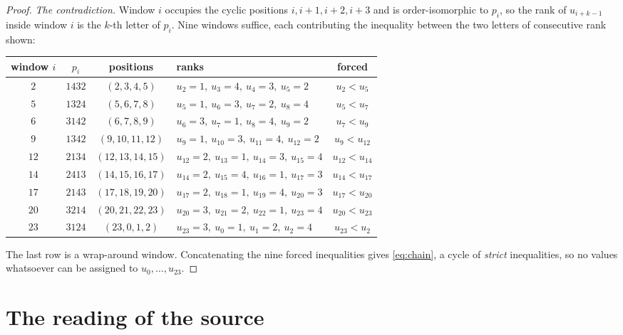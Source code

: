 \documentclass[11pt]{amsart}
\begin{document}
\begin{proof}
\emph{The contradiction.} Window $i$ occupies the cyclic positions
$i,i+1,i+2,i+3$ and is order-isomorphic to $p_i$, so the rank of $u_{i+k-1}$
inside window $i$ is the $k$-th letter of $p_i$. Nine windows suffice, each
contributing the inequality between the two letters of consecutive rank shown:
\begin{center}\small
\begin{tabular}{c|c|c|l|c}
window $i$ & $p_i$ & positions & ranks & forced\\\hline
$2$ & $1432$ & $(2,3,4,5)$ & $u_2{=}1,\ u_3{=}4,\ u_4{=}3,\ u_5{=}2$ & $u_2<u_5$\\
$5$ & $1324$ & $(5,6,7,8)$ & $u_5{=}1,\ u_6{=}3,\ u_7{=}2,\ u_8{=}4$ & $u_5<u_7$\\
$6$ & $3142$ & $(6,7,8,9)$ & $u_6{=}3,\ u_7{=}1,\ u_8{=}4,\ u_9{=}2$ & $u_7<u_9$\\
$9$ & $1342$ & $(9,10,11,12)$ & $u_9{=}1,\ u_{10}{=}3,\ u_{11}{=}4,\ u_{12}{=}2$ & $u_9<u_{12}$\\
$12$ & $2134$ & $(12,13,14,15)$ & $u_{12}{=}2,\ u_{13}{=}1,\ u_{14}{=}3,\ u_{15}{=}4$ & $u_{12}<u_{14}$\\
$14$ & $2413$ & $(14,15,16,17)$ & $u_{14}{=}2,\ u_{15}{=}4,\ u_{16}{=}1,\ u_{17}{=}3$ & $u_{14}<u_{17}$\\
$17$ & $2143$ & $(17,18,19,20)$ & $u_{17}{=}2,\ u_{18}{=}1,\ u_{19}{=}4,\ u_{20}{=}3$ & $u_{17}<u_{20}$\\
$20$ & $3214$ & $(20,21,22,23)$ & $u_{20}{=}3,\ u_{21}{=}2,\ u_{22}{=}1,\ u_{23}{=}4$ & $u_{20}<u_{23}$\\
$23$ & $3124$ & $(23,0,1,2)$ & $u_{23}{=}3,\ u_0{=}1,\ u_1{=}2,\ u_2{=}4$ & $u_{23}<u_2$
\end{tabular}
\end{center}
The last row is a wrap-around window. Concatenating the nine forced
inequalities gives \eqref{eq:chain}, a cycle of \emph{strict} inequalities, so
no values whatsoever can be assigned to $u_0,\dots,u_{23}$.
\end{proof}

\section{The reading of the source}
\end{document}
